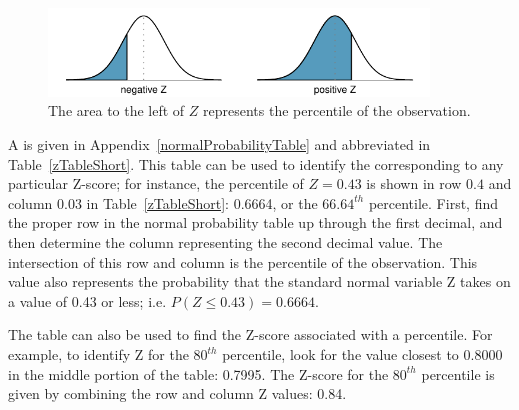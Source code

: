 \begin{figure}[h!]
	\centering
	\includegraphics[width=0.9\textwidth]{ch_distributions_oi_biostat/figures/normalTails/normalTails}
	\caption{The area to the left of $Z$ represents the percentile of the observation.}
	\label{normalTails}
\end{figure}

A  is given in Appendix~\vref{normalProbabilityTable} and abbreviated in Table~\ref{zTableShort}. This table can be used to identify the  corresponding to any particular Z-score; for instance, the percentile of $Z=0.43$ is shown in row $0.4$ and column $0.03$ in Table~\ref{zTableShort}: 0.6664, or the $66.64^{th}$ percentile. First, find the proper row in the normal probability table up through the first decimal, and then determine the column representing the second decimal value. The intersection of this row and column is the percentile of the observation. This value also represents the probability that the standard normal variable Z takes on a value of 0.43 or less; i.e. $P(Z \leq 0.43) = 0.6664$.

The table can also be used to find the Z-score associated with a percentile. For example, to identify Z for the $80^{th}$ percentile, look for the value closest to 0.8000 in the middle portion of the table: 0.7995. The Z-score for the $80^{th}$ percentile is given by combining the row and column Z values: 0.84.

